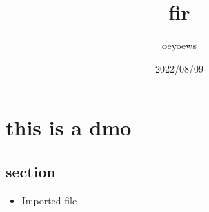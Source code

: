 \documentclass{article}
\title{fir}
\author{oeyoews}
\date{2022/08/09}
\begin{document}
\maketitle


\section{this is a dmo}%
\label{sec:this is a dmo}

\subsection*{section}%
\label{sub:section}

\begin{itemize}
  \item   Imported file
\end{itemize}
\end{document}
